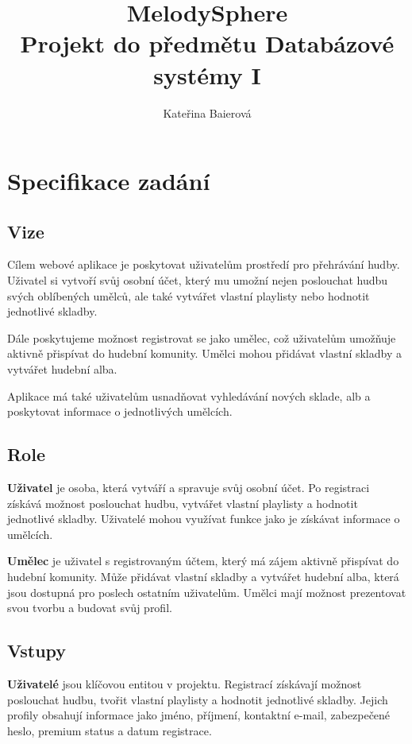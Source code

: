 \documentclass[czech,12pt,a4paper,titlepage]{article}
\title{%
    \textbf {MelodySphere} \\
    \bigskip
    \large Projekt do předmětu Databázové systémy I}
\author{Kateřina Baierová}
\date{}
\begin{document}
    \graphicspath{ {./img/} }

    \begin{titlepage}
        \maketitle
        \thispagestyle{empty}
    \end{titlepage}

    \tableofcontents

    \clearpage


    \section{Specifikace zadání}\label{sec:specifikace-zadani}
    \subsection*{Vize}
    Cílem webové aplikace je poskytovat uživatelům prostředí pro přehrávání hudby.
    Uživatel si vytvoří svůj osobní účet, který mu umožní nejen poslouchat
    hudbu svých oblíbených umělců, ale také vytvářet
    vlastní playlisty nebo hodnotit jednotlivé skladby.

    Dále poskytujeme možnost registrovat se jako umělec,
    což uživatelům umožňuje aktivně přispívat do hudební komunity.
    Umělci mohou přidávat vlastní skladby a vytvářet hudební alba.

    Aplikace má také uživatelům usnadňovat vyhledávání nových sklade, alb
    a poskytovat informace o jednotlivých umělcích.


    \subsection*{Role}
    \textbf{Uživatel} je osoba, která vytváří a spravuje svůj osobní účet.
    Po registraci získává možnost poslouchat hudbu, vytvářet vlastní playlisty
    a hodnotit jednotlivé skladby.
    Uživatelé mohou využívat funkce jako je získávat informace o umělcích.


    \textbf{Umělec} je uživatel s registrovaným účtem, který má zájem aktivně přispívat do hudební komunity.
    Může přidávat vlastní skladby a vytvářet hudební alba, která jsou dostupná pro poslech ostatním uživatelům.
    Umělci mají možnost prezentovat svou tvorbu a budovat svůj profil.

    \subsection*{Vstupy}
    \textbf{Uživatelé} jsou klíčovou entitou v projektu.
    Registrací získávají možnost poslouchat hudbu, tvořit vlastní playlisty a hodnotit jednotlivé skladby.
    Jejich profily obsahují informace jako jméno, příjmení, kontaktní e-mail, zabezpečené heslo, premium status a datum registrace.
\end{document}
